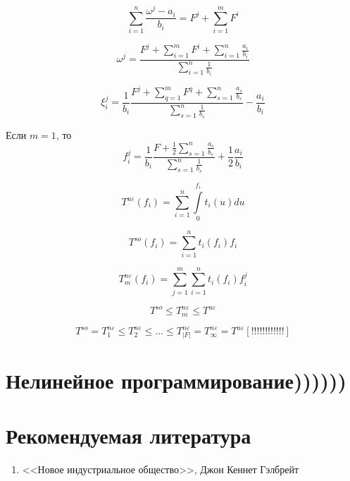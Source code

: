 \documentclass[12pt,a4paper,titlepage,oneside]{book}
\theoremstyle{definition}
\theoremstyle{plain}
\theoremstyle{remark}
\theoremstyle{remark}
\theoremstyle{plain}
\theoremstyle{plain}
\begin{document}
\begin{equation*}
\sum\limits_{i=1}^n\frac{\omega^j - a_i}{b_i} = F^j + \sum\limits_{i=1}^m F^i
\end{equation*}

\begin{equation*}
\omega^j = \frac{F^j + \sum\limits_{i=1}^m F^i + \sum\limits_{i=1}^n  \frac{a_i}{b_i}}{\sum\limits_{i=1}^n \frac{1}{b_i}}
\end{equation*}

\begin{equation*}
\xi_i^j = \frac{1}{b_i}\frac{F^j + \sum\limits_{q=1}^m F^q + \sum\limits_{s=1}^n \frac{a_s}{b_s}}{\sum\limits_{s=1}^n \frac{1}{b_s}} - \frac{a_i}{b_i}
\end{equation*}

Если $m=1$, то
\begin{equation*}
f_i^j = \frac{1}{b_i}\frac{F+ \frac{1}{2}\sum\limits_{s=1}^n \frac{a_s}{b_s}}{\sum\limits_{s=1}^n\frac{1}{b_s}} + \frac{1}{2}\frac{a_i}{b_i}
\end{equation*}

\begin{equation*}
T^{u \varepsilon}(f_i) = \sum\limits_{i=1}^n \int\limits_0^{f_i} t_i(u)du
\end{equation*}

\begin{equation*}
T^{so}(f_i) = \sum\limits_{i=1}^n t_i(f_i)f_i
\end{equation*}


\begin{equation*}
T_m^{n \varepsilon}(f_i) = \sum\limits_{j=1}^m \sum\limits_{i=1}^n t_i(f_i)f_i^j
\end{equation*}

\begin{equation*}
T^{so} \leq T_m^{n \varepsilon} \leq T^{u \varepsilon}
\end{equation*}

\begin{equation*}
T^{so} = T_1^{n \varepsilon} \leq T_2^{n \varepsilon} \leq \dots \leq T_{|F|}^{n \varepsilon} 
= T_{\infty}^{n \varepsilon} = T^{u \varepsilon} [!!!!!!!!!!!!]
\end{equation*}

\chapter{Нелинейное программирование))))))}


\chapter{Рекомендуемая литература}

\begin{enumerate}
\item <<Новое индустриальное общество>>, Джон Кеннет Гэлбрейт
\end{enumerate}
\end{document}
